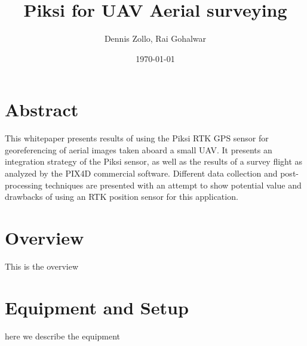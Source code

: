\documentclass{article}
\title{Piksi for UAV Aerial surveying}
\author{Dennis Zollo, Rai Gohalwar}
\date{\today}
\begin{document}
\maketitle

\thispagestyle{firstpage}

\section{Abstract}
\label{sec:abstract}
This whitepaper presents results of using the Piksi RTK GPS sensor for georeferencing of aerial images taken aboard a small UAV.  
It presents an integration strategy of the Piksi sensor, as well as the results of a survey flight as analyzed by the PIX4D commercial software. 
Different data collection and post-processing techniques are presented with an attempt to show potential value and drawbacks of using an RTK position sensor for this application.
\tableofcontents
\newpage
\section{Overview}
\label{sec:Overview}
This is the overview
\section{Equipment and Setup}
\label{sec:equipment}
here we describe the equipment
\thispagestyle{lastpage}
\end{document}
